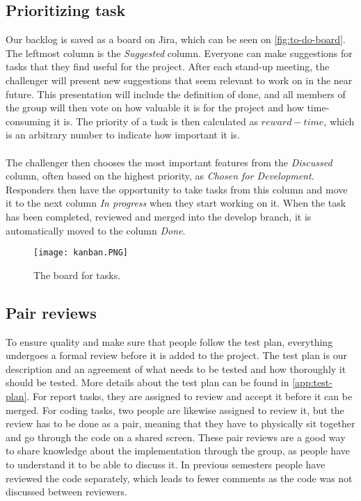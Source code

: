 \subsection{Prioritizing task}
Our backlog is saved as a board on Jira, which can be seen on \autoref{fig:to-do-board}.
The leftmost column is the \textit{Suggested} column.
Everyone can make suggestions for tasks that they find useful for the project.
After each stand-up meeting, the challenger will present new suggestions that seem relevant to work on in the near future.
This presentation will include the definition of done, and all members of the group will then vote on how valuable it is for the project and how time-consuming it is.
The priority of a task is then calculated as $reward - time$, which is an arbitrary number to indicate how important it is.
\\\\
The challenger then chooses the most important features from the \textit{Discussed} column, often based on the highest priority, as \textit{Chosen for Development}.
Responders then have the opportunity to take tasks from this column and move it to the next column \textit{In progress} when they start working on it.
When the task has been completed, reviewed and merged into the develop branch, it is automatically moved to the column \textit{Done}.
\begin{figure}[H]
    \centering
    \texttt{[image: kanban.PNG]}
    \caption{The board for tasks.}
    \label{fig:to-do-board}
\end{figure}

\subsection{Pair reviews}
To ensure quality and make sure that people follow the test plan, everything undergoes a formal review before it is added to the project. 
The test plan is our description and an agreement of what needs to be tested and how thoroughly it should be tested.
More details about the test plan can be found in \autoref{app:test-plan}.
For report tasks, they are assigned to review and accept it before it can be merged.
For coding tasks, two people are likewise assigned to review it, but the review has to be done as a pair, meaning that they have to physically sit together and go through the code on a shared screen.
These pair reviews are a good way to share knowledge about the implementation through the group, as people have to understand it to be able to discuss it.
In previous semesters people have reviewed the code separately, which leads to fewer comments as the code was not discussed between reviewers.
